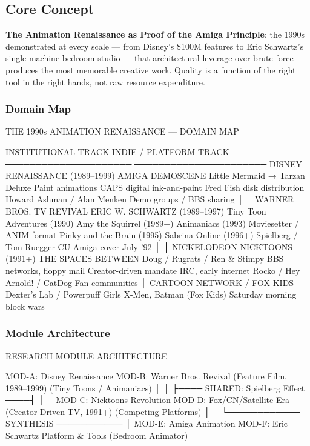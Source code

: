 \documentclass[11pt,letterpaper]{article}
\begin{document}
\subsection{Core Concept}

\textbf{The Animation Renaissance as Proof of the Amiga Principle}: the 1990s demonstrated at every scale --- from Disney's \$100M features to Eric Schwartz's single-machine bedroom studio --- that architectural leverage over brute force produces the most memorable creative work. Quality is a function of the right tool in the right hands, not raw resource expenditure.

\subsubsection{Domain Map}

\begin{asciibox}
THE 1990s ANIMATION RENAISSANCE — DOMAIN MAP

INSTITUTIONAL TRACK                    INDIE / PLATFORM TRACK
─────────────────────                  ──────────────────────
DISNEY RENAISSANCE (1989–1999)         AMIGA DEMOSCENE
  Little Mermaid → Tarzan                 Deluxe Paint animations
  CAPS digital ink-and-paint              Fred Fish disk distribution
  Howard Ashman / Alan Menken            Demo groups / BBS sharing
           │                                      │
WARNER BROS. TV REVIVAL                ERIC W. SCHWARTZ (1989–1997)
  Tiny Toon Adventures (1990)             Amy the Squirrel (1989+)
  Animaniacs (1993)                       Moviesetter / ANIM format
  Pinky and the Brain (1995)             Sabrina Online (1996+)
  Spielberg / Tom Ruegger               CU Amiga cover July '92
           │                                      │
NICKELODEON NICKTOONS (1991+)          THE SPACES BETWEEN
  Doug / Rugrats / Ren & Stimpy           BBS networks, floppy mail
  Creator-driven mandate                  IRC, early internet
  Rocko / Hey Arnold! / CatDog            Fan communities
           │
CARTOON NETWORK / FOX KIDS
  Dexter's Lab / Powerpuff Girls
  X-Men, Batman (Fox Kids)
  Saturday morning block wars
\end{asciibox}

\subsubsection{Module Architecture}

\begin{asciibox}
RESEARCH MODULE ARCHITECTURE

  MOD-A: Disney Renaissance     MOD-B: Warner Bros. Revival
  (Feature Film, 1989–1999)     (Tiny Toons / Animaniacs)
         │                              │
         ├──── SHARED: Spielberg Effect ────┤
         │                              │
  MOD-C: Nicktoons Revolution   MOD-D: Fox/CN/Satellite Era
  (Creator-Driven TV, 1991+)    (Competing Platforms)
         │                              │
         └──────────── SYNTHESIS ───────────
                          │
  MOD-E: Amiga Animation   MOD-F: Eric Schwartz
  Platform & Tools          (Bedroom Animator)
\end{asciibox}
\end{document}
